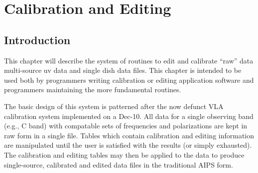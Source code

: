 \setcounter{chapter}{15} %
\chapter{Calibration and Editing}
\setcounter{page}{1}
\section{Introduction }

This chapter will describe the system of routines to edit and
calibrate ``raw'' data multi-source uv data and single dish data
files.  This chapter is intended to be used both by programmers
writing calibration or editing application software and programmers
maintaining the more fundamental routines.

The basic design of this system is patterned after the now defunct VLA
calibration system implemented on a Dec-10.  All data for a single
observing band (e.g., C band) with compatable sets of frequencies and
polarizations are kept in raw form in a single file. Tables which
contain calibration and editing information are manipulated until the
user is satisfied with the results (or simply exhausted). The
calibration and editing tables may then be applied to the data to
produce single-source, calibrated and edited data files in the
traditional AIPS form.

